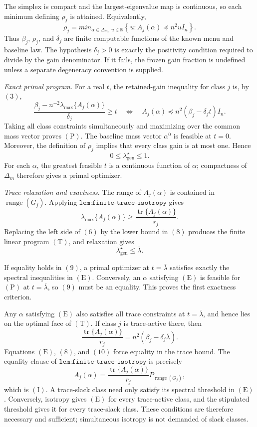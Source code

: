 The simplex is compact and the largest-eigenvalue map is continuous, so each minimum defining \(\rho_j\) is attained.  Equivalently,
\[
\rho_j=min_{\alpha\in\Delta_m,\ u\in\mathbb R}
\left\{u:A_j(\alpha)\preceq n^2uI_n\right\}.
\tag{5}
\]
Thus \(\beta_j\), \(\rho_j\), and \(\delta_j\) are finite computable functions of the known menu and baseline law.  The hypothesis \(\delta_j>0\) is exactly the positivity condition required to divide by the gain denominator.  If it fails, the frozen gain fraction is undefined unless a separate degeneracy convention is supplied.

\textit{Exact primal program.}
For a real \(t\), the retained-gain inequality for class \(j\) is, by \((3)\),
\[
\frac{\beta_j-n^{-2}\lambda_{\max}\{A_j(\alpha)\}}{\delta_j}\ge t
\quad\Longleftrightarrow\quad
A_j(\alpha)\preceq n^2(\beta_j-\delta_jt)I_n.
\tag{6}
\]
Taking all class constraints simultaneously and maximizing over the common mass vector proves \((\mathrm P)\).  The baseline mass vector \(\alpha^0\) is feasible at \(t=0\).  Moreover, the definition of \(\rho_j\) implies that every class gain is at most one.  Hence
\[
0\le\lambda_{\mathrm{gen}}^\star\le1.
\tag{7}
\]
For each \(\alpha\), the greatest feasible \(t\) is a continuous function of \(\alpha\); compactness of \(\Delta_m\) therefore gives a primal optimizer.

\textit{Trace relaxation and exactness.}
The range of \(A_j(\alpha)\) is contained in \(\operatorname{range}(G_j)\).  Applying \(\texttt{lem:finite-trace-isotropy}\) gives
\[
\lambda_{\max}\{A_j(\alpha)\}
\ge \frac{\operatorname{tr}\{A_j(\alpha)\}}{r_j}.
\tag{8}
\]
Replacing the left side of \((6)\) by the lower bound in \((8)\) produces the finite linear program \((\mathrm T)\), and relaxation gives
\[
\lambda_{\mathrm{gen}}^\star\le\overline\lambda.
\tag{9}
\]

If equality holds in \((9)\), a primal optimizer at \(t=\overline\lambda\) satisfies exactly the spectral inequalities in \((\mathrm E)\).  Conversely, an \(\alpha\) satisfying \((\mathrm E)\) is feasible for \((\mathrm P)\) at \(t=\overline\lambda\), so \((9)\) must be an equality.  This proves the first exactness criterion.

Any \(\alpha\) satisfying \((\mathrm E)\) also satisfies all trace constraints at \(t=\overline\lambda\), and hence lies on the optimal face of \((\mathrm T)\).  If class \(j\) is trace-active there, then
\[
\frac{\operatorname{tr}\{A_j(\alpha)\}}{r_j}
=n^2(\beta_j-\delta_j\overline\lambda).
\tag{10}
\]
Equations \((\mathrm E)\), \((8)\), and \((10)\) force equality in the trace bound.  The equality clause of \(\texttt{lem:finite-trace-isotropy}\) is precisely
\[
A_j(\alpha)
=\frac{\operatorname{tr}\{A_j(\alpha)\}}{r_j}
P_{\operatorname{range}(G_j)},
\]
which is \((\mathrm I)\).  A trace-slack class need only satisfy its spectral threshold in \((\mathrm E)\).  Conversely, isotropy gives \((\mathrm E)\) for every trace-active class, and the stipulated threshold gives it for every trace-slack class.  These conditions are therefore necessary and sufficient; simultaneous isotropy is not demanded of slack classes.

